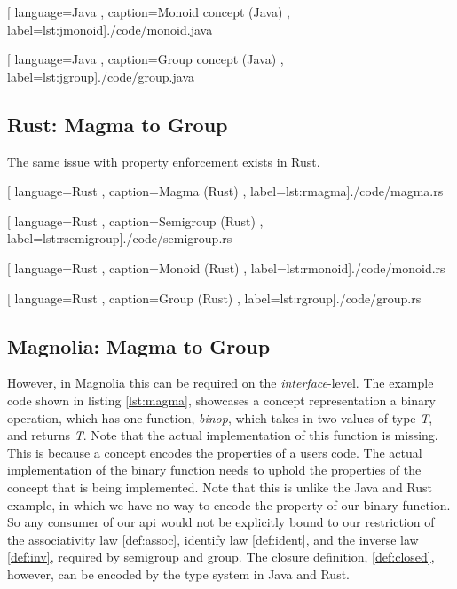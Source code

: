 \begin{center}
  
    [ language=Java
    , caption={Monoid concept (Java)}
    , label=lst:jmonoid]{./code/monoid.java}
\end{center}

\begin{center}
  
    [ language=Java
    , caption={Group concept (Java)}
    , label=lst:jgroup]{./code/group.java}
\end{center}

\subsection{Rust: Magma to Group}

The same issue with property enforcement exists in Rust.

\begin{center}
  
    [ language=Rust
    , caption={Magma (Rust)}
    , label=lst:rmagma]{./code/magma.rs}
\end{center}

\begin{center}
  
    [ language=Rust
    , caption={Semigroup (Rust)}
    , label=lst:rsemigroup]{./code/semigroup.rs}
\end{center}

\begin{center}
  
    [ language=Rust
    , caption={Monoid (Rust)}
    , label=lst:rmonoid]{./code/monoid.rs}
\end{center}

\begin{center}
  
    [ language=Rust
    , caption={Group (Rust)}
    , label=lst:rgroup]{./code/group.rs}
\end{center}

\subsection{Magnolia: Magma to Group}

However, in Magnolia this can be required on the \textit{interface}-level. The
example code shown in listing \ref{lst:magma}, showcases a concept
representation a binary operation, which has one function, \textit{binop}, which
takes in two values of type \textit{T}, and returns \textit{T}. Note that the
actual implementation of this function is missing. This is because a concept
encodes the properties of a users code. The actual implementation of the
binary function needs to uphold the properties of the concept that is
being implemented. Note that this is unlike the Java and Rust example, in
which we have no way to encode the property of our binary function. So any
consumer of our \gls*{api} would not be explicitly bound to our restriction of
the associativity law \ref{def:assoc}, identify law \ref{def:ident}, and the
inverse law \ref{def:inv}, required by semigroup and group. The closure
definition, \ref{def:closed}, however, can be encoded by the type system in Java
and Rust.

